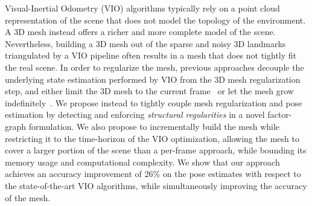  Visual-Inertial Odometry (VIO) algorithms typically rely on a point cloud representation of the scene that does not model the topology of the environment.
 A 3D mesh instead offers a richer and more complete model of the scene.
 Nevertheless, building a 3D mesh out of the sparse and noisy 3D landmarks triangulated by a VIO pipeline often results in a mesh that does not tightly fit the real scene.
  In order to regularize the mesh, previous approaches decouple the underlying state estimation performed by VIO from the 3D mesh regularization step, and either limit the 3D mesh to the current frame~\cite{Greene17iccv,Teixeira16iros} or let the mesh grow indefinitely~\cite{Pollefeys2008ijcv,Litvinov2013bmvc}.
 We propose instead to tightly couple mesh regularization and pose estimation by detecting and enforcing \emph{structural regularities} in a novel factor-graph formulation.
 We also propose to incrementally build the mesh while restricting it to the time-horizon of the VIO optimization, allowing the mesh to cover a larger portion of the scene than a per-frame approach, while bounding its memory usage and computational complexity.
We show that our approach achieves an accuracy improvement of 26\% on the pose estimates with respect to the state-of-the-art VIO algorithms, while simultaneously improving the accuracy of the mesh.